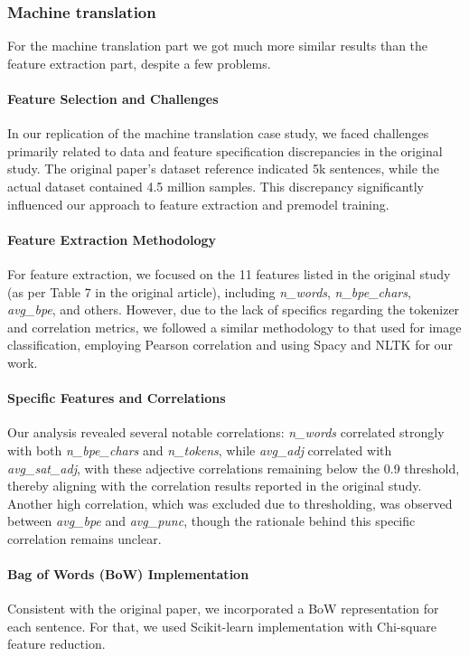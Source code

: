 \subsubsection{Machine translation}
For the machine translation part we got much more similar results than the feature extraction part, despite a few problems.

\paragraph{Feature Selection and Challenges}
In our replication of the machine translation case study, we faced challenges primarily related to data and feature specification discrepancies in the original study. The original paper's dataset reference indicated 5k sentences, while the actual dataset contained 4.5 million samples. This discrepancy significantly influenced our approach to feature extraction and premodel training.

\paragraph{Feature Extraction Methodology}
For feature extraction, we focused on the 11 features listed in the original study (as per Table 7 in the original article), including \textit{n\_words}, \textit{n\_bpe\_chars}, \textit{avg\_bpe}, and others. However, due to the lack of specifics regarding the tokenizer and correlation metrics, we followed a similar methodology to that used for image classification, employing Pearson correlation and using Spacy and NLTK for our work.

\paragraph{Specific Features and Correlations}
Our analysis revealed several notable correlations: \textit{n\_words} correlated strongly with both \textit{n\_bpe\_chars} and \textit{n\_tokens}, while \textit{avg\_adj} correlated with \textit{avg\_sat\_adj}, with these adjective correlations remaining below the 0.9 threshold, thereby aligning with the correlation results reported in the original study. Another high correlation, which was excluded due to thresholding, was observed between \textit{avg\_bpe} and \textit{avg\_punc}, though the rationale behind this specific correlation remains unclear.

\paragraph{Bag of Words (BoW) Implementation}
Consistent with the original paper, we incorporated a BoW representation for each sentence. For that, we used Scikit-learn implementation with Chi-square feature reduction.


